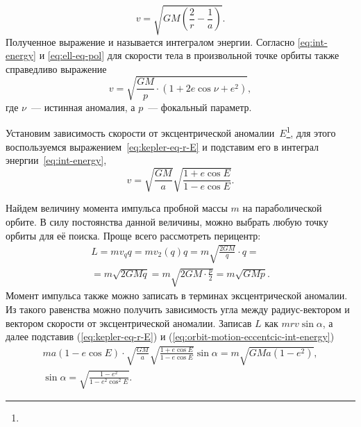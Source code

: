 \begin{equation}
    v = \sqrt{ GM \left( \frac{2}{r} - \frac{1}{a} \right)}.
    \label{eq:int-energy}
\end{equation}
Полученное выражение и называется интегралом энергии. Согласно \eqref{eq:int-energy} и \eqref{eq:ell-eq-pol} для скорости тела в произвольной точке орбиты также справедливо выражение
\begin{equation}
    v = \sqrt{\frac{GM}{p}\cdot(1 + 2 e \cos \nu + e^2)},
\end{equation}
где $\nu$~--- истинная аномалия, а $p$~--- фокальный параметр.

Установим зависимость скорости от эксцентрической аномалии~$E$\footnote{}, для этого воспользуемся выражением~\eqref{eq:kepler-eq-r-E} и подставим его в интеграл энергии~\eqref{eq:int-energy}, 
\begin{equation}
	v = \sqrt{\frac{GM}{a}}\sqrt{\frac{1 + e \cos E}{1 - e \cos E}}.
	\label{eq:orbit-motion-eccentcic-int-energy}
\end{equation}


Найдем величину момента импульса пробной массы $m$ на параболической орбите. В силу постоянства данной величины, можно выбрать любую точку орбиты для её поиска. Проще всего рассмотреть перицентр:
\begin{multline*}
    L
    = m v_q q
    = m v_2(q) q
    = m \sqrt{\frac{2GM}{q}} \cdot q =\\
    = m \sqrt{2GMq}
    = m \sqrt{2GM \cdot \frac{p}{2}}
    = m \sqrt{GMp}.
\end{multline*}
Момент импульса также можно записать в терминах эксцентрической аномалии. Из такого равенства можно получить зависимость угла между радиус-вектором и вектором скорости от эксцентрической аномалии. Записав $L$ как $m r v \sin \alpha$, а далее подставив (\ref{eq:kepler-eq-r-E}) и (\ref{eq:orbit-motion-eccentcic-int-energy})
\begin{gather}
	m a (1 - e \cos E) \cdot \sqrt{\frac{GM}{a}}\sqrt{\frac{1 + e \cos E}{1 - e \cos E}} \sin \alpha = m \sqrt{GMa(1-e^2)}, \nonumber\\
	 \sin \alpha = \sqrt{\frac{1-e^2}{1- e^2 \cos^2 E}}.
\end{gather}

